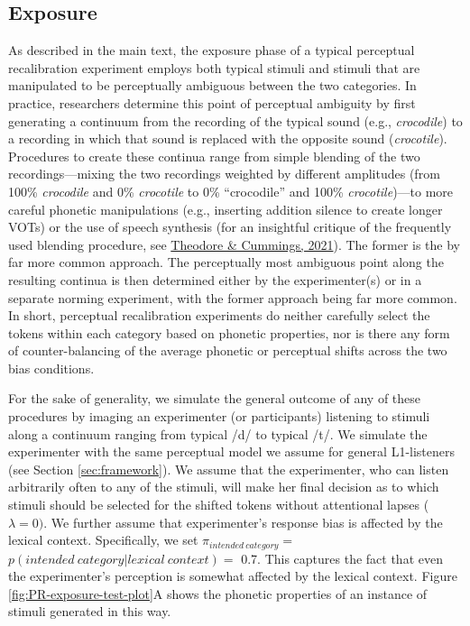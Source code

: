 \documentclass[
  11pt,
  english,
  man,floatsintext]{apa6}
\begin{document}
\hypertarget{exposure}{%
\subsection{Exposure}\label{exposure}}

As described in the main text, the exposure phase of a typical perceptual recalibration experiment employs both typical stimuli and stimuli that are manipulated to be perceptually ambiguous between the two categories. In practice, researchers determine this point of perceptual ambiguity by first generating a continuum from the recording of the typical sound (e.g., \emph{crocodile}) to a recording in which that sound is replaced with the opposite sound (\emph{crocotile}). Procedures to create these continua range from simple blending of the two recordings---mixing the two recordings weighted by different amplitudes (from 100\% \emph{crocodile} and 0\% \emph{crocotile} to 0\% ``crocodile'' and 100\% \emph{crocotile})---to more careful phonetic manipulations (e.g., inserting addition silence to create longer VOTs) or the use of speech synthesis (for an insightful critique of the frequently used blending procedure, see \protect\hyperlink{ref-theodore-cummings2021}{Theodore \& Cummings, 2021}). The former is the by far more common approach. The perceptually most ambiguous point along the resulting continua is then determined either by the experimenter(s) or in a separate norming experiment, with the former approach being far more common. In short, perceptual recalibration experiments do neither carefully select the tokens within each category based on phonetic properties, nor is there any form of counter-balancing of the average phonetic or perceptual shifts across the two bias conditions.

For the sake of generality, we simulate the general outcome of any of these procedures by imaging an experimenter (or participants) listening to stimuli along a continuum ranging from typical /d/ to typical /t/. We simulate the experimenter with the same perceptual model we assume for general L1-listeners (see Section \ref{sec:framework}). We assume that the experimenter, who can listen arbitrarily often to any of the stimuli, will make her final decision as to which stimuli should be selected for the shifted tokens without attentional lapses (\(\lambda=0)\). We further assume that experimenter's response bias is affected by the lexical context. Specifically, we set \(\pi_{intended~category} =\) \(p(intended~category | lexical~context) =\) 0.7. This captures the fact that even the experimenter's perception is somewhat affected by the lexical context. Figure \ref{fig:PR-exposure-test-plot}A shows the phonetic properties of an instance of stimuli generated in this way.
\end{document}
